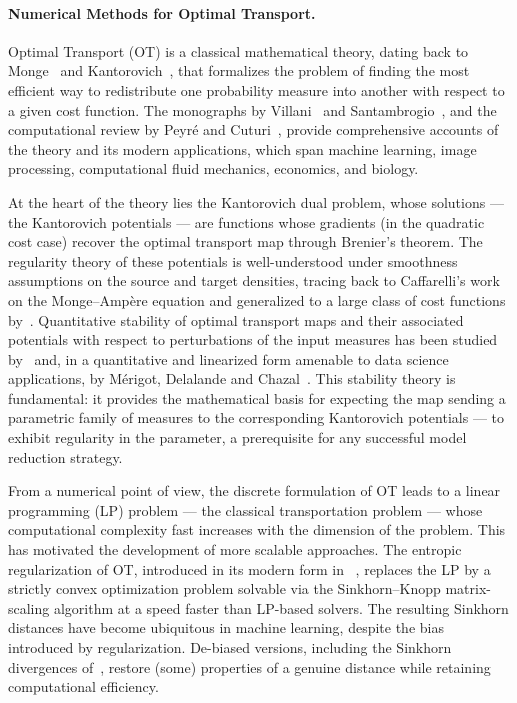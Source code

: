 \documentclass{article}
\begin{document}
\paragraph{Numerical Methods for Optimal Transport.} Optimal Transport (OT) is a classical mathematical theory, dating back to Monge~\cite{monge1781memoire} and Kantorovich~\cite{kantorovich2006translocation}, that formalizes the problem of finding the most efficient way to redistribute one probability measure into another with respect to a given cost function. The monographs by Villani~\cite{villani2021topics,villani2009optimal} and Santambrogio~\cite{santambrogio2015optimal}, and the computational review by Peyré and Cuturi~\cite{COTFNT}, provide comprehensive accounts of the theory and its modern applications, which span machine learning, image processing, computational fluid mechanics, economics, and biology.

At the heart of the theory lies the Kantorovich dual problem, whose solutions — the Kantorovich potentials — are functions whose gradients (in the quadratic cost case) recover the optimal transport map through Brenier's theorem. The regularity theory of these potentials is well-understood under smoothness assumptions on the source and target densities, tracing back to Caffarelli's work on the Monge–Ampère equation and generalized to a large class of cost functions by~\cite{ma2005regularity}. Quantitative stability of optimal transport maps and their associated potentials with respect to perturbations of the input measures has been studied by~\cite{gigli2011holder} and, in a quantitative and linearized form amenable to data science applications, by Mérigot, Delalande and Chazal~\cite{merigot2020quantitative}. This stability theory is fundamental: it provides the mathematical basis for expecting the map sending a parametric family of measures to the corresponding Kantorovich potentials — to exhibit regularity in the parameter, a prerequisite for any successful model reduction strategy.

From a numerical point of view, the discrete formulation of OT leads to a linear programming (LP) problem — the classical transportation problem — whose computational complexity fast increases with the dimension of the problem. This has motivated the development of more scalable approaches. The entropic regularization of OT, introduced in its modern form in ~\cite{cuturi2013sinkhorn,galichon2022cupid,benamou2015iterative}, replaces the LP by a strictly convex optimization problem solvable via the Sinkhorn–Knopp matrix-scaling algorithm at a speed  faster than LP-based solvers. The resulting Sinkhorn distances have become ubiquitous in machine learning, despite the bias introduced by regularization. De-biased versions, including the Sinkhorn divergences of~\cite{feydy2019interpolating}, restore (some) properties of a genuine distance while retaining computational efficiency.
\end{document}
